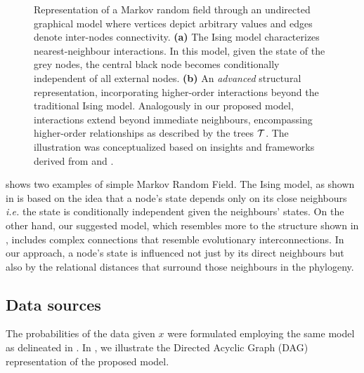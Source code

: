 \documentclass[
11pt, %
oneside, %
english, %
singlespacing, %
headsepline, %
chapterinoneline, %
]{MastersDoctoralThesis} %
\def\T{{\cal T}}
\begin{document}
\begin{figure}[h]
\begin{subfigure}[b]{0.49\textwidth}
		\caption{}
		\label{fig: Ising model higher order}
	\end{subfigure}
	\caption{Representation of a Markov random field through an undirected graphical model where vertices depict arbitrary values and edges denote inter-nodes connectivity. \textbf{(a)} The Ising model \cite{isingBeitragZurTheorie1925} characterizes nearest-neighbour interactions. In this model, given the state of the grey nodes, the central black node becomes conditionally independent of all external nodes. \textbf{(b)} An \textit{advanced} structural representation, incorporating higher-order interactions beyond the traditional Ising model. Analogously in our proposed model, interactions extend beyond immediate neighbours, encompassing higher-order relationships as described by the trees $\T$. The illustration was conceptualized based on insights and frameworks derived from \cite{MarkovRandomField} and \cite{acarMarkovRandomField2016}. }
	\label{fig:MRF}
\end{figure}

 shows two examples of simple Markov Random Field. The Ising model, as shown in  is based on the idea that a node's state depends only on its close neighbours \textit{i.e.} the state is conditionally independent given the neighbours' states. On the other hand, our suggested model, which resembles more to the structure shown in , includes complex connections that resemble evolutionary interconnections. In our approach, a node's state is influenced not just by its direct neighbours but also by the relational distances that surround those neighbours in the phylogeny.

\subsection{Data sources}\label{subsec:data source RMF}
The probabilities of the data given $x$ were formulated employing the same model as delineated in . In , we illustrate the Directed Acyclic Graph (DAG) representation of the proposed model.
\end{document}
